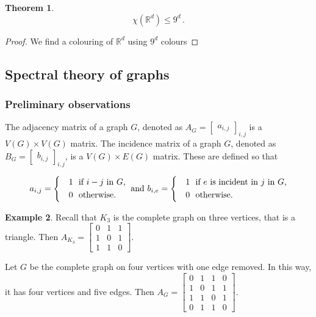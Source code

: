 \documentclass[12pt]{amsart}
\theoremstyle{definition}
\newtheorem{thm}{Theorem}[section]
\newtheorem{smpl}[thm]{Example}
\newcommand{\R}{\mathbb{R}}
\begin{document}
\begin{thm}
$$\chi(\R^d) \leq 9^d \, .$$
\end{thm}

\begin{proof}
We find a colouring of $\R^d$ using $9^d $ colours
\end{proof}

\subsection{Spectral theory of graphs}



\subsubsection*{Preliminary observations}

The adjacency matrix of a graph $G$, denoted as $A_{G} = 
\begin{bmatrix}
a_{i,j}
\end{bmatrix}_{i, j}$ is a $V(G)\times V(G)$ matrix.
The incidence matrix of a graph $G$, denoted as $B_{G} = 
\begin{bmatrix}
b_{i,j}
\end{bmatrix}_{i, j}$, is a $V(G) \times E(G)$ matrix.
These are defined so that

$$ a_{i, j} =\begin{cases*}
      & 1 \text{ if $i \-- j$ in $G$,}\\
      & 0 \text{ otherwise.}
    \end{cases*}  \text{ and }
b_{i, e} =\begin{cases*}
      & 1 \text{ if $e$ is incident in $j$ in $G$,}\\
      & 0 \text{ otherwise.}
    \end{cases*}
    $$

\begin{smpl}
Recall that $K_3$ is the complete graph on three vertices, that is a triangle.
Then $A_{K_3} = 
\begin{bmatrix}
0 & 1 & 1\\
1 & 0 & 1\\
1 & 1 & 0
\end{bmatrix}$.


Let $G$ be the complete graph on four vertices with one edge removed.
In this way, it has four vertices and five edges.
Then $A_{G} = 
\begin{bmatrix}
0 & 1 & 1 & 0\\
1 & 0 & 1 & 1\\
1 & 1 & 0 & 1\\
0 & 1 & 1 & 0
\end{bmatrix}$.


\end{smpl}
\end{document}
